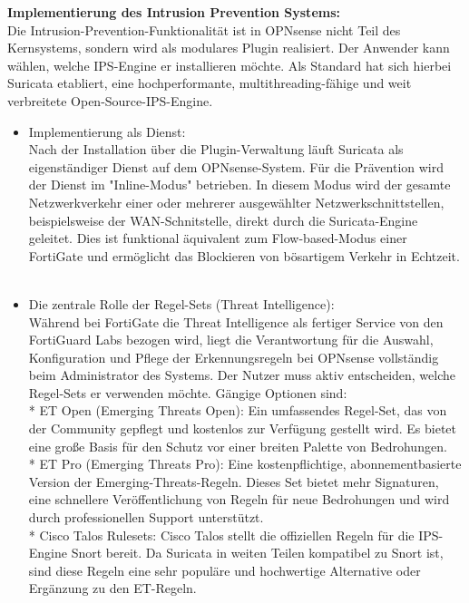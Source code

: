 \textbf{Implementierung des Intrusion Prevention Systems:}\\
Die Intrusion-Prevention-Funktionalität ist in OPNsense nicht Teil des Kernsystems, sondern wird als modulares Plugin realisiert. Der Anwender kann wählen, welche IPS-Engine er installieren möchte. Als Standard hat sich hierbei Suricata etabliert, eine hochperformante, multithreading-fähige und weit verbreitete Open-Source-IPS-Engine.\\
\begin{itemize}
	\item Implementierung als Dienst:\\ Nach der Installation über die Plugin-Verwaltung läuft Suricata als eigenständiger Dienst auf dem OPNsense-System. Für die Prävention wird der Dienst im "Inline-Modus" betrieben. In diesem Modus wird der gesamte Netzwerkverkehr einer oder mehrerer ausgewählter Netzwerkschnittstellen, beispielsweise der WAN-Schnitstelle, direkt durch die Suricata-Engine geleitet. Dies ist funktional äquivalent zum Flow-based-Modus einer FortiGate und ermöglicht das Blockieren von bösartigem Verkehr in Echtzeit.\\\\

	\item Die zentrale Rolle der Regel-Sets (Threat Intelligence):\\ Während bei FortiGate die Threat Intelligence als fertiger Service von den FortiGuard Labs bezogen wird, liegt die Verantwortung für die Auswahl, Konfiguration und Pflege der Erkennungsregeln bei OPNsense vollständig beim Administrator des Systems. Der Nutzer muss aktiv entscheiden, welche Regel-Sets er verwenden möchte. Gängige Optionen sind:\\
* ET Open (Emerging Threats Open): Ein umfassendes Regel-Set, das von der Community gepflegt und kostenlos zur Verfügung gestellt wird. Es bietet eine große Basis für den Schutz vor einer breiten Palette von Bedrohungen.\\
* ET Pro (Emerging Threats Pro): Eine kostenpflichtige, abonnementbasierte Version der Emerging-Threats-Regeln. Dieses Set bietet mehr Signaturen, eine schnellere Veröffentlichung von Regeln für neue Bedrohungen und wird durch professionellen Support unterstützt.\\
* Cisco Talos Rulesets: Cisco Talos stellt die offiziellen Regeln für die IPS-Engine Snort bereit. Da Suricata in weiten Teilen kompatibel zu Snort ist, sind diese Regeln eine sehr populäre und hochwertige Alternative oder Ergänzung zu den ET-Regeln.\\\\


\end{itemize}
